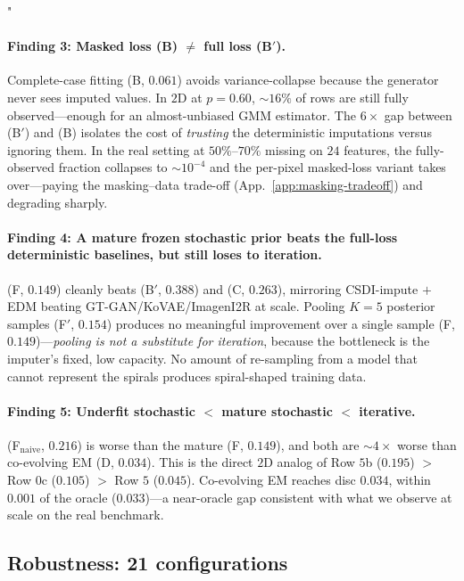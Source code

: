 "\documentclass{article}
\theoremstyle{plain}
\theoremstyle{definition}
\theoremstyle{remark}
\begin{document}
\paragraph{Finding 3: Masked loss (B) $\neq$ full loss (B$'$).}
Complete-case fitting (B, $0.061$) avoids variance-collapse because the generator never sees imputed values. In $2$D at $p = 0.60$, ${\sim}16\%$ of rows are still fully observed---enough for an almost-unbiased GMM estimator. The $6\times$ gap between (B$'$) and (B) isolates the cost of \emph{trusting} the deterministic imputations versus ignoring them. In the real setting at $50\%$--$70\%$ missing on $24$ features, the fully-observed fraction collapses to $\sim 10^{-4}$ and the per-pixel masked-loss variant takes over---paying the masking--data trade-off (App.~\ref{app:masking-tradeoff}) and degrading sharply.

\paragraph{Finding 4: A mature frozen stochastic prior beats the full-loss deterministic baselines, but still loses to iteration.}
(F, $0.149$) cleanly beats (B$'$, $0.388$) and (C, $0.263$), mirroring CSDI-impute $+$ EDM beating GT-GAN/KoVAE/ImagenI2R at scale. Pooling $K = 5$ posterior samples (F$'$, $0.154$) produces no meaningful improvement over a single sample (F, $0.149$)---\emph{pooling is not a substitute for iteration}, because the bottleneck is the imputer's fixed, low capacity. No amount of re-sampling from a model that cannot represent the spirals produces spiral-shaped training data.

\paragraph{Finding 5: Underfit stochastic $<$ mature stochastic $<$ iterative.}
(F$_{\mathrm{naive}}$, $0.216$) is worse than the mature (F, $0.149$), and both are ${\sim}4\times$ worse than co-evolving EM (D, $0.034$). This is the direct $2$D analog of Row $5$b ($0.195$) $>$ Row $0$c ($0.105$) $>$ Row $5$ ($0.045$). Co-evolving EM reaches disc $0.034$, within $0.001$ of the oracle ($0.033$)---a near-oracle gap consistent with what we observe at scale on the real benchmark.

\subsection{Robustness: 21 configurations}
\label{app:toy-robustness}
\end{document}
